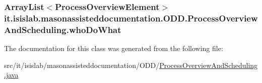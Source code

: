 \hypertarget{classit_1_1isislab_1_1masonassisteddocumentation_1_1_o_d_d_1_1_process_overview_and_scheduling_a49308d0d5d6ef19e3cdf25e5b8fdd798}{
\subsubsection[{who\-Do\-What}]{\setlength{\rightskip}{0pt plus 5cm}Array\-List$<${\bf Process\-Overview\-Element}$>$ it.\-isislab.\-masonassisteddocumentation.\-O\-D\-D.\-Process\-Overview\-And\-Scheduling.\-who\-Do\-What\hspace{0.3cm}{\ttfamily [private]}}}\label{classit_1_1isislab_1_1masonassisteddocumentation_1_1_o_d_d_1_1_process_overview_and_scheduling_a49308d0d5d6ef19e3cdf25e5b8fdd798}


The documentation for this class was generated from the following file\-:\begin{DoxyCompactItemize}
\item 
src/it/isislab/masonassisteddocumentation/\-O\-D\-D/\hyperlink{_process_overview_and_scheduling_8java}{Process\-Overview\-And\-Scheduling.\-java}\end{DoxyCompactItemize}
